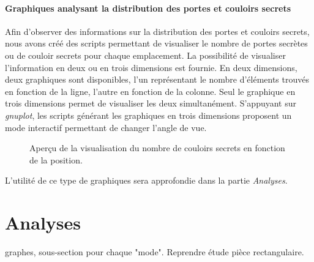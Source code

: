 \documentclass[a4paper,12pt]{article}
\begin{document}
\paragraph{Graphiques analysant la distribution des portes et couloirs secrets}
Afin d'observer des informations sur la distribution des portes et couloirs
secrets, nous avons créé des scripts permettant de visualiser le nombre de
portes secrètes ou de couloir secrets pour chaque emplacement. La possibilité de
visualiser l'information en deux ou en trois dimensions est fournie. En deux
dimensions, deux graphiques sont disponibles, l'un représentant le nombre
d'éléments trouvés en fonction de la ligne, l'autre en fonction de la colonne.
Seul le graphique en trois dimensions permet de visualiser les deux
simultanément. S'appuyant sur {\em gnuplot}, les scripts générant les graphiques
en trois dimensions proposent un mode interactif permettant de changer l'angle
de vue.

\begin{figure}[H]
  \caption{\label{fig:move_graph} Aperçu de la visualisation du nombre de
    couloirs secrets en fonction de la position.}
\end{figure}

L'utilité de ce type de graphiques sera approfondie dans la partie
{\em Analyses}.


\section{Analyses}

graphes, sous-section pour chaque "mode". Reprendre étude pièce rectangulaire.
\end{document}
